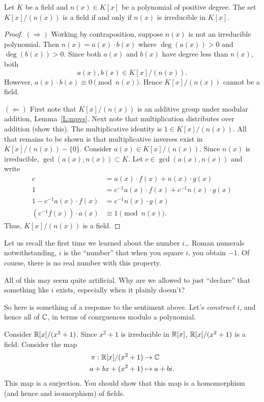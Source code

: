 \documentclass{ximera}
\begin{document}
\begin{theorem}\label{T:cmip}
  Let $K$ be a field and $n(x)\in K[x]$ be a polynomial of positive
  degree. The set $K[x]/(n(x))$ is a field if and only if $n(x)$ is
  irreducible in $K[x]$.
  \begin{proof}
    $(\Rightarrow)$ Working by contraposition, suppose $n(x)$ is not
    an irreducible polynomial. Then $n(x) = a(x)\cdot b(x)$ where
    $\deg(a(x))>0$ and $\deg(b(x))>0$. Since both $a(x)$ and $b(x)$
    have degree less than $n(x)$, both
    \[
    a(x),b(x)\in K[x]/(n(x)).
    \]
    However, $a(x)\cdot b(x) \equiv 0 \pmod{n(x)}$. Hence $K[x]/(n(x))$
    cannot be a field.
    


    $(\Leftarrow)$ First note that $K[x]/(n(x))$ is an additive group
    under modular addition, Lemma~\ref{L:mpvs}. Next note that
    multiplication distributes over addition (show this). The
    multiplicative identity is $1\in K[x]/(n(x))$. All that remains to
    be shown is that multiplicative inverses exist in
    $K[x]/(n(x))-\{0\}$. Consider $a(x)\in K[x]/(n(x))$. Since $n(x)$
    is irreducible, $\gcd(a(x),n(x)) \subset K$. Let $c\in
    \gcd(a(x),n(x))$ and write
    \begin{align*}
      c &= a(x) \cdot f(x) + n(x) \cdot g(x) \\
      1 &= c^{-1}a(x) \cdot f(x) + c^{-1}n(x) \cdot g(x) \\
      1 - c^{-1}a(x) \cdot f(x)  &=c^{-1}n(x) \cdot g(x) \\
      (c^{-1} f(x)) \cdot a(x) &\equiv 1 \pmod{n(x)}.
    \end{align*}
    Thus, $K[x]/(n(x))$ is a field.
  \end{proof}
\end{theorem}

Let us recall the first time we learned about the number $i$\dots
Roman numerals notwithstanding, $i$ is the ``number'' that when you
square $i$, you obtain $-1$. Of course, there is no real number with
this property.

All of this may seem quite artificial. Why are we allowed to just
``declare'' that something like $i$ exists, especially when it plainly
doesn't?

So here is something of a response to the sentiment above. Let's
\textit{construct} $i$, and hence all of $\mathbb C$, in terms of conrguences
modulo a polynomial.

\begin{example}
  Consider $\mathbb R[x]/(x^2+1)$. Since $x^2+1$ is irreducible in $\mathbb R[x]$,
  $\mathbb R[x]/(x^2+1)$ is a field. Consider the map
  \begin{align*}
    \pi: \mathbb R[x]/(x^2+1) &\to \mathbb C\\
    a  + bx + (x^2+1) &\mapsto a+ bi.
  \end{align*}
  This map is a surjection. You should show that this map is a
  homomorphism (and hence and isomorphism) of fields.
\end{example}
\end{document}
